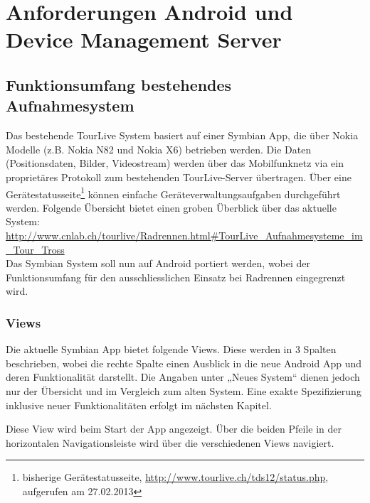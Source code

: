 \section{Anforderungen Android und Device Management Server}
\label{sec:anforderungenandroiddevmgmt}

\subsection{Funktionsumfang bestehendes Aufnahmesystem}
Das bestehende TourLive System basiert auf einer Symbian App, die über Nokia Modelle (z.B. Nokia N82 und Nokia X6) betrieben werden. Die Daten (Positionsdaten, Bilder, Videostream) werden über das Mobilfunknetz via ein proprietäres Protokoll zum bestehenden TourLive-Server übertragen. Über eine Gerätestatusseite\footnote{bisherige Gerätestatusseite, \url{http://www.tourlive.ch/tds12/status.php}, aufgerufen am 27.02.2013}   können einfache Geräteverwaltungsaufgaben durchgeführt werden. Folgende Übersicht bietet einen groben Überblick über das aktuelle System: \url{
http://www.cnlab.ch/tourlive/Radrennen.html#TourLive_Aufnahmesysteme_im_Tour_Tross} \\

Das Symbian System soll nun auf Android portiert werden, wobei der Funktionsumfang für den ausschliesslichen Einsatz bei Radrennen eingegrenzt wird. 

\subsubsection{Views}
Die aktuelle Symbian App bietet folgende Views. Diese werden in 3 Spalten beschrieben, wobei die rechte Spalte einen Ausblick in die neue Android App und deren Funktionalität darstellt. Die Angaben unter „Neues System“ dienen jedoch nur der Übersicht und im Vergleich zum alten System. Eine exakte Spezifizierung inklusive neuer Funktionalitäten erfolgt im nächsten Kapitel.

Diese View wird beim Start der App angezeigt. Über die beiden Pfeile in der horizontalen Navigationsleiste wird über die verschiedenen Views navigiert.

